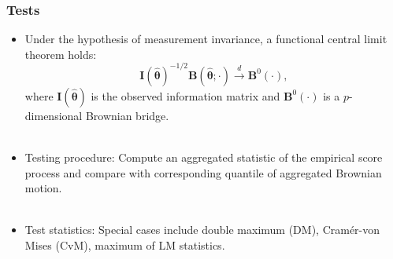 \documentclass{beamer}
\begin{document}
\begin{frame}[fragile]
  \frametitle{Tests}
  \begin{itemize}
    \item Under the hypothesis of
      measurement invariance, a functional central limit
      theorem holds:
  \begin{equation*}
  {\bm{I}}(\widehat{{\bm{\theta}}})^{-1/2}{\bm{B}}(\widehat{{\bm{\theta}}}; \cdot) 
\overset{d}{\rightarrow} {\bm B}^{0}(\cdot),
  \end{equation*}
 where ${\bm{I}}(\widehat{{\bm{\theta}}})$ is the observed
 information matrix and ${\bm B}^{0}(\cdot)$ is a
 $p$-dimensional Brownian bridge.\\ \ \\

   \item Testing procedure: Compute an aggregated statistic of the empirical
     score process and compare with corresponding quantile of aggregated
     Brownian motion.\\ \ \\

    \item Test statistics: Special cases include double maximum (DM), Cram\'er-von Mises
      (CvM), maximum of LM statistics.
  \end{itemize}
\end{frame}

\end{document}
